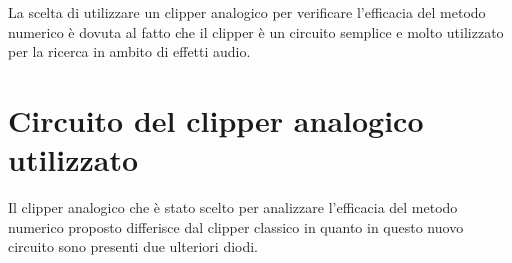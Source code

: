 		La scelta di utilizzare un clipper analogico per verificare l'efficacia del metodo numerico è dovuta al fatto che il clipper è un circuito semplice e molto utilizzato per la ricerca in ambito di effetti audio.
	\pagebreak
	
	\section{Circuito del clipper analogico utilizzato}
		Il clipper analogico che è stato scelto per analizzare l'efficacia del metodo numerico proposto differisce dal clipper classico in quanto in questo nuovo circuito sono presenti due ulteriori diodi.
		
		\vspace{15px}
		\begin{comment}
		\begin{figure}[H]
			\centering
			\begin{circuitikz}[american voltages]
				\draw
				(-1,7) to[sinusoidal voltage source,l_=$V_{in}$] (-1,0)		%
				(-1,7) to[resistor=$R_{in}$] (3,7)							%
				to[short, i^=$i_{in}$] (4,7)									%
				to[short, i^=$i_{out}$] (5,7)								%
				-- (8,7)														%
				to[C, l_=$C$] (8,0)											%
				-- (-1,0)													%
				(4,0) node[ground]{}											%
				
				(4,7) to[short, *-*] (4,6)			%
				(4,7) to[short, i^=$i_{D}$] (4,6)	%
				(5,6) -- (3,6)						%
				to[empty diode, l=$D_{A}$] (3,4)		%
				-- (5,4)								%
				to[empty diode, l_=$D_{A}$] (5,6)	%
				(4,4) to[short, *-*] (4,3)			%
				(5,3) -- (3,3)						%
				to[full diode, l=$D_{B}$] (3,1)		%
				-- (5,1)								%
				to[full diode, l_=$D_{B}$] (5,3)		%
				(4,1) to[short, *-*] (4,0)			%
				
				(-1,2.5) to[open, v_<=$$, outer sep = 2mm] (-1,4.5)			%
				(3,6) to[open, v_=$V_{A}$, outer sep = 5mm] (3,4)			%
				(3,3) to[open, v_=$V_{B}$, outer sep = 5mm] (3,1)			%
				(8,7) to[open, v^=$V_{out}$, outer sep = 6mm] (8,0)			%
				;
			\end{circuitikz}
			\caption{Circuito elettronico del clipper audio utilizzato}
			\label{fig:clipper}
		\end{figure}
		\end{comment}
